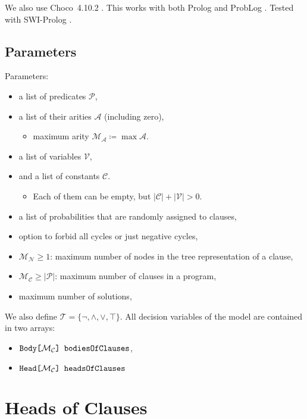 \documentclass[runningheads]{llncs}
\newcommand{\variable}[1]{\texttt{\textup{#1}}}
\newcommand{\arrayt}[3]{\variable{{#3}[}{#2}\variable{] {#1}}}
\newcommand{\predicates}{\mathcal{P}}
\newcommand{\variables}{\mathcal{V}}
\newcommand{\constants}{\mathcal{C}}
\newcommand{\tokens}{\mathcal{T}}
\newcommand{\arities}{\mathcal{A}}
\newcommand{\maxArity}{\mathcal{M}_{\mathcal{A}}}
\newcommand{\maxNumNodes}{\mathcal{M}_{\mathcal{N}}}
\newcommand{\maxNumClauses}{\mathcal{M}_{\mathcal{C}}}
\begin{document}
We also use Choco~4.10.2 \cite{choco}. This works with both Prolog
\cite{DBLP:books/daglib/0041598} and ProbLog \cite{DBLP:conf/ijcai/RaedtKT07}.
Tested with SWI-Prolog \cite{DBLP:journals/tplp/WielemakerSTL12}.

\subsection{Parameters}

Parameters:
\begin{itemize}
\item a list of predicates $\predicates{}$,
\item a list of their arities $\arities{}$ (including zero),
  \begin{itemize}
  \item maximum arity $\maxArity{} \coloneqq \max \arities{}$.
  \end{itemize}
\item a list of variables $\variables{}$,
\item and a list of constants $\constants{}$.
  \begin{itemize}
  \item Each of them can be empty, but $|\constants{}| + |\variables{}| > 0$.
  \end{itemize}
\item a list of probabilities that are randomly assigned to clauses,
\item option to forbid all cycles or just negative cycles,
\item $\maxNumNodes{} \ge 1$: maximum number of nodes in the tree representation
  of a clause,
\item $\maxNumClauses{} \ge |\predicates{}|$: maximum number of clauses in a
  program,
\item maximum number of solutions,
\end{itemize}

We also define $\tokens{} = \{ \neg, \land, \lor, \top \}$. All decision
variables of the model are contained in two arrays:
\begin{itemize}
\item $\arrayt{bodiesOfClauses}{\maxNumClauses{}}{Body}$,
\item $\arrayt{headsOfClauses}{\maxNumClauses{}}{Head}$
\end{itemize}

\section{Heads of Clauses}
\end{document}
